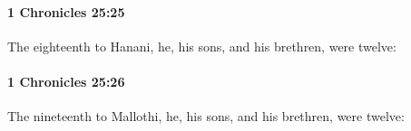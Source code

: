 		\paragraph{1 Chronicles 25:25} %
			\label{1CHRONICLES-25-25}

			The eighteenth to Hanani, he, his sons, and his brethren, were twelve:


		\paragraph{1 Chronicles 25:26} %
			\label{1CHRONICLES-25-26}

			The nineteenth to Mallothi, he, his sons, and his brethren, were twelve:


